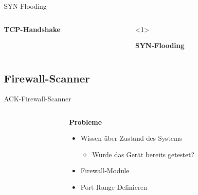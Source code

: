 \begin{frame}[fragile]{SYN-Flooding}
	\begin{columns}
		\begin{column}{0.5\textwidth}
			\begin{center}
				\textbf{TCP-Handshake}
				
			\end{center}
		\end{column}
		\begin{column}{0.5\textwidth}
			\begin{visibleenv}<1>
				\begin{center}
					\textbf{SYN-Flooding}
					
				\end{center}
			\end{visibleenv}
		\end{column}
	\end{columns}
	
	\note{
		Notes
	}
\end{frame}

\subsection{Firewall-Scanner}

\begin{frame}{ACK-Firewall-Scanner}
	\begin{columns}
		\begin{column}{0.5\textwidth}
			\begin{center}
				
			\end{center}
		\end{column}
		\begin{column}{0.5\textwidth}
			\begin{center}
				\textbf{Probleme}
				\begin{itemize}
					\item Wissen über Zustand des Systems
					\begin{itemize}
						\item Wurde das Gerät bereits getestet?
					\end{itemize}
					\item Firewall-Module
					\item Port-Range-Definieren
				\end{itemize}
			\end{center}
		\end{column}
	\end{columns}
	
\end{frame}

